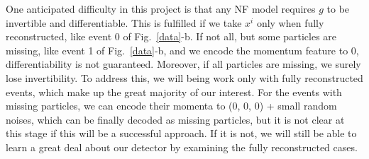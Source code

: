 One anticipated difficulty in this project is that any NF model requires $g$ to be invertible and differentiable. This is fulfilled if we take $x^i$ only when fully reconstructed, like event 0 of Fig.~\ref{data}-b. If not all, but some particles are missing, like event 1 of Fig.~\ref{data}-b, and we encode the momentum feature to 0, differentiability is not guaranteed. Moreover, if all particles are missing, we surely lose invertibility. To address this, we will being work only with fully reconstructed events, which make up the great majority of our interest.  For the events with missing particles, we can encode their momenta to (0, 0, 0) +  small random noises, which can be finally decoded as missing particles, but it is not clear at this stage if this will be a successful approach. If it is not, we will still be able to learn a great deal about our detector by examining the fully reconstructed cases.





